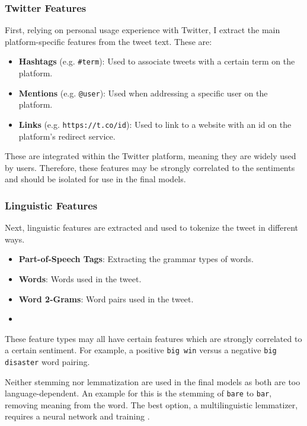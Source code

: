 \documentclass[11pt]{article}
\begin{document}
\subsubsection{{T}witter Features}

First, relying on personal usage experience with {T}witter, I extract the main platform-specific features from the tweet text.
These are:
\begin{itemize}
	\item \textbf{Hashtags} (e.g. \texttt{\#term}): Used to associate tweets with a certain term on the platform.
	\item \textbf{Mentions} (e.g. \texttt{@user}): Used when addressing a specific user on the platform.
	\item \textbf{Links} (e.g. \texttt{https://t.co/id}): Used to link to a website with an id on the platform's redirect service.
\end{itemize}  

These are integrated within the {T}witter platform, meaning they are widely used by users.
Therefore, these features may be strongly correlated to the sentiments and should be isolated for use in the final models.

\subsubsection{Linguistic Features}

Next, linguistic features are extracted and used to tokenize the tweet in different ways. 

\begin{itemize}
	\item \textbf{Part-of-Speech Tags}: Extracting the grammar types of words.
	\item \textbf{Words}: Words used in the tweet.
	\item \textbf{Word 2-Grams}: Word pairs used in the tweet.
	\item 
\end{itemize}  

These feature types may all have certain features which are strongly correlated to a certain sentiment.
For example, a positive \texttt{big win} versus a negative \texttt{big disaster} word pairing.

Neither stemming nor lemmatization are used in the final models as both are too language-dependent.
An example for this is the stemming of \texttt{bare} to \texttt{bar}, removing meaning from the word.
The best option, a multilinguistic lemmatizer, requires a neural network and training \cite{lemmat19}.
\end{document}
